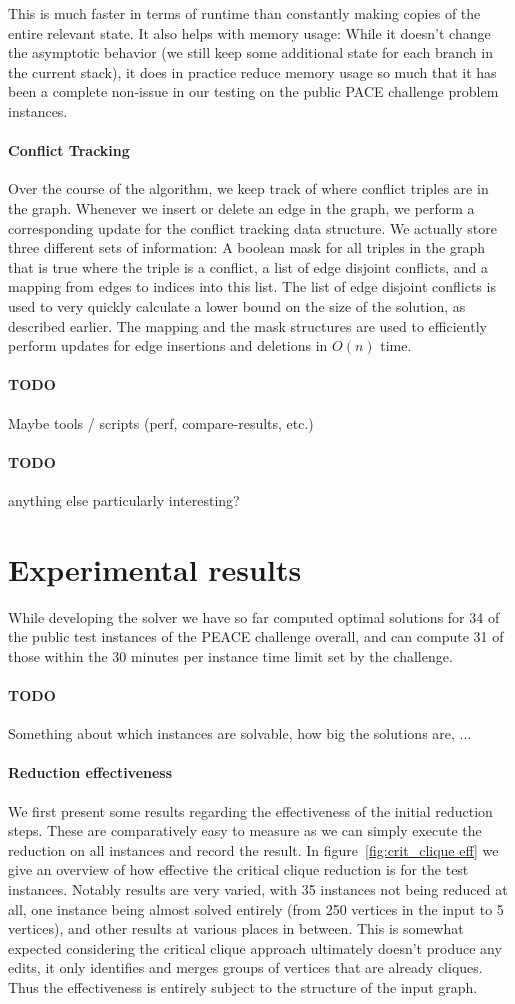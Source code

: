 \documentclass{article}
\newcommand{\todo}[1]{\paragraph{TODO} #1}
\theoremstyle{definition}
\begin{document}
This is much faster in terms of runtime than constantly making copies of the entire relevant state.
It also helps with memory usage: While it doesn't change the asymptotic behavior (we still keep
some additional state for each branch in the current stack), it does in practice reduce memory usage
so much that it has been a complete non-issue in our testing on the public PACE challenge problem
instances.

\paragraph{Conflict Tracking} Over the course of the algorithm, we keep track of where conflict
triples are in the graph. Whenever we insert or delete an edge in the graph, we perform a
corresponding update for the conflict tracking data structure. We actually store three different
sets of information: A boolean mask for all triples in the graph that is true where the triple is a
conflict, a list of edge disjoint conflicts, and a mapping from edges to indices into this list.
The list of edge disjoint conflicts is used to very quickly calculate a lower bound on the size of
the solution, as described earlier. The mapping and the mask structures are used to efficiently
perform updates for edge insertions and deletions in $O(n)$ time.

\todo Maybe tools / scripts (perf, compare-results, etc.)
\todo anything else particularly interesting?

\section{Experimental results}

While developing the solver we have so far computed optimal solutions for 34 of the public test
instances of the PEACE challenge overall, and can compute 31 of those within the 30 minutes per
instance time limit set by the challenge.

\todo Something about which instances are solvable, how big the solutions are, ... 

\paragraph{Reduction effectiveness} We first present some results regarding the effectiveness of the
initial reduction steps. These are comparatively easy to measure as we can simply execute the
reduction on all instances and record the result. In figure~\ref{fig:crit_clique eff} we give an
overview of how effective the critical clique reduction is for the test instances. Notably results
are very varied, with 35 instances not being reduced at all, one instance being almost solved
entirely (from 250 vertices in the input to 5 vertices), and other results at various places in
between. This is somewhat expected considering the critical clique approach ultimately doesn't
produce any edits, it only identifies and merges groups of vertices that are already cliques. Thus
the effectiveness is entirely subject to the structure of the input graph.
\end{document}
